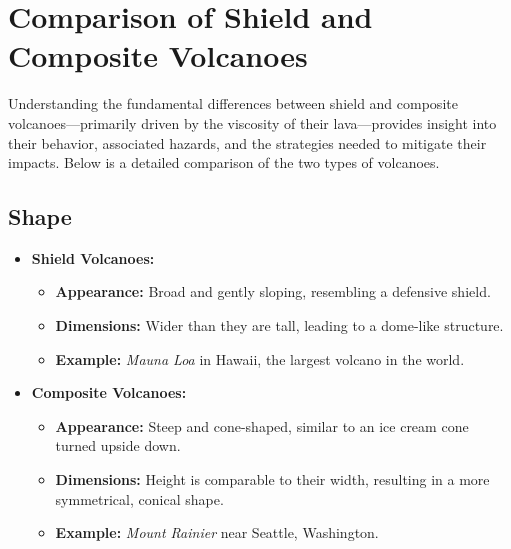 \documentclass{article}
\begin{document}
\section{Comparison of Shield and Composite Volcanoes}
Understanding the fundamental differences between shield and composite volcanoes—primarily driven by the viscosity of their lava—provides insight into their behavior, associated hazards, and the strategies needed to mitigate their impacts. Below is a detailed comparison of the two types of volcanoes.

\subsection{Shape}
\begin{itemize}[leftmargin=*, label={--}]
    \item \textbf{Shield Volcanoes:}
    \begin{itemize}[leftmargin=*, label={$\bullet$}]
        \item \textbf{Appearance:} Broad and gently sloping, resembling a defensive shield.
        \item \textbf{Dimensions:} Wider than they are tall, leading to a dome-like structure.
        \item \textbf{Example:} \textit{Mauna Loa} in Hawaii, the largest volcano in the world.
    \end{itemize}
    
    \item \textbf{Composite Volcanoes:}
    \begin{itemize}[leftmargin=*, label={$\bullet$}]
        \item \textbf{Appearance:} Steep and cone-shaped, similar to an ice cream cone turned upside down.
        \item \textbf{Dimensions:} Height is comparable to their width, resulting in a more symmetrical, conical shape.
        \item \textbf{Example:} \textit{Mount Rainier} near Seattle, Washington.
    \end{itemize}
\end{itemize}
\end{document}
